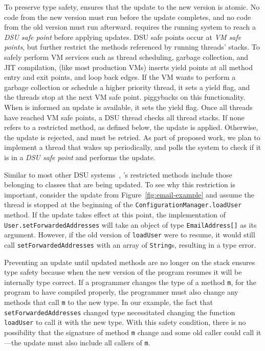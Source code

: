 To preserve type safety, \DSU{} ensures that the update to the new
version is atomic.  No code from the new version must run before the
update completes, and no code from the old version must run afterward.
\DSU{} requires the running system to reach a \emph{DSU safe point}
before applying updates.  DSU safe points occur at \emph{VM safe
  points}, but further restrict the methods referenced by running
threads' stacks.  To safely perform VM services such as thread
scheduling, garbage collection, and \acs{JIT} compilation, \JikesRVM{} (like
most production VMs) inserts yield points at all method entry and exit
points, and loop back edges.  If the VM wants to perform a garbage
collection or schedule a higher priority thread, it sets a yield flag,
and the threads stop at the next VM safe point.  \DSU{} piggybacks on
this functionality.  When \DSU{} is informed an update is available,
it sets the yield flag.  Once all threads have reached VM safe points,
a DSU thread checks all thread stacks.  If none refers to a restricted
method, as defined below, the update is applied.  Otherwise, the
update is rejected, and must be retried. As part of proposed work, we
plan to implement a \DSU{} thread that wakes up periodically, and polls the
system to check if it is in a \emph{DSU safe point} and performs the
update.


Similar to most other DSU
systems~\cite{ritzau00dynamic,Mala00a,altekar05opus,eaddy05enc,JVMhotswap,VSEnC,chen:icse07,K42reconfig},
\DSU's restricted methods include those belonging to classes that are
being updated.  To see why this restriction is important, consider the
update from Figure~\ref{fig:email-example} and assume the thread is
stopped at the beginning of the
\texttt{Configuration\-Manager.loadUser} method.  If the update takes
effect at this point, the implementation of
\texttt{User.set\-Forwarded\-Addresses} will take an object of type
\texttt{EmailAddress[]} as its argument.  However, if the old version
of \texttt{loadUser} were to resume, it would still call
\texttt{set\-Forwarded\-Addresses} with an array of \texttt{String}s,
resulting in a type error.

Preventing an update until updated methods are no longer on the stack 
ensures type safety because when the new version of the program resumes it
will be 
internally type correct.  If a 
programmer changes the type of a method \texttt{m}, for the program to
have compiled properly, the programmer must also change any methods that
call \texttt{m} to the new type.
In our example, the fact that \texttt{set\-For\-ward\-ed\-Ad\-dres\-ses}
changed type necessitated changing the function \texttt{loadUser} to
call it with the new type.  With this safety condition, there is no
possibility that the signature of method
\texttt{m} change and some old caller could call it---the update must also
include all callers of \texttt{m}.

